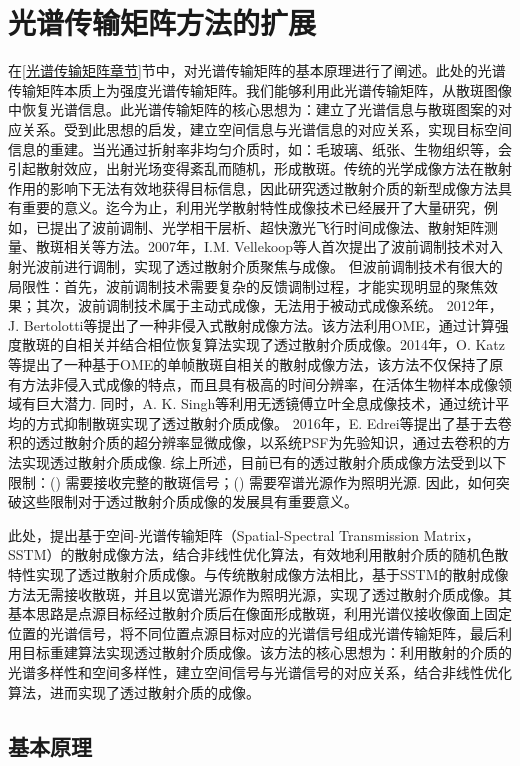 \section{光谱传输矩阵方法的扩展}
在\ref{光谱传输矩阵章节}节中，对光谱传输矩阵的基本原理进行了阐述。此处的光谱传输矩阵本质上为强度光谱传输矩阵。我们能够利用此光谱传输矩阵，从散斑图像中恢复光谱信息。此光谱传输矩阵的核心思想为：建立了光谱信息与散斑图案的对应关系。受到此思想的启发，建立空间信息与光谱信息的对应关系，实现目标空间信息的重建。当光通过折射率非均匀介质时，如：毛玻璃、纸张、生物组织等，会引起散射效应，出射光场变得紊乱而随机，形成散斑。传统的光学成像方法在散射作用的影响下无法有效地获得目标信息，因此研究透过散射介质的新型成像方法具有重要的意义。迄今为止，利用光学散射特性成像技术已经展开了大量研究，例如，已提出了波前调制、光学相干层析、超快激光飞行时间成像法、散射矩阵测量、散斑相关等方法。2007年，I.M. Vellekoop等人首次提出了波前调制技术对入射光波前进行调制，实现了透过散射介质聚焦与成像。 但波前调制技术有很大的局限性：首先，波前调制技术需要复杂的反馈调制过程，才能实现明显的聚焦效果；其次，波前调制技术属于主动式成像，无法用于被动式成像系统。 2012年，J. Bertolotti等提出了一种非侵入式散射成像方法。该方法利用OME，通过计算强度散斑的自相关并结合相位恢复算法实现了透过散射介质成像。2014年，O. Katz等提出了一种基于OME的单帧散斑自相关的散射成像方法，该方法不仅保持了原有方法非侵入式成像的特点，而且具有极高的时间分辨率，在活体生物样本成像领域有巨大潜力. 同时，A. K. Singh等利用无透镜傅立叶全息成像技术，通过统计平均的方式抑制散斑实现了透过散射介质成像。 2016年，E. Edrei等提出了基于去卷积的透过散射介质的超分辨率显微成像，以系统PSF为先验知识，通过去卷积的方法实现透过散射介质成像. 综上所述，目前已有的透过散射介质成像方法受到以下限制：() 需要接收完整的散斑信号；() 需要窄谱光源作为照明光源. 因此，如何突破这些限制对于透过散射介质成像的发展具有重要意义。

此处，提出基于空间-光谱传输矩阵（Spatial-Spectral Transmission Matrix，SSTM）的散射成像方法，结合非线性优化算法，有效地利用散射介质的随机色散特性实现了透过散射介质成像。与传统散射成像方法相比，基于SSTM的散射成像方法无需接收散斑，并且以宽谱光源作为照明光源，实现了透过散射介质成像。其基本思路是点源目标经过散射介质后在像面形成散斑，利用光谱仪接收像面上固定位置的光谱信号，将不同位置点源目标对应的光谱信号组成光谱传输矩阵，最后利用目标重建算法实现透过散射介质成像。该方法的核心思想为：利用散射的介质的光谱多样性和空间多样性，建立空间信号与光谱信号的对应关系，结合非线性优化算法，进而实现了透过散射介质的成像。
\subsection{基本原理}

